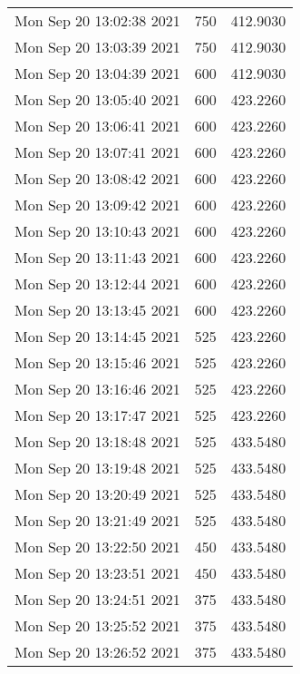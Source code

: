 \begin{longtable}{lrr}
Mon Sep 20 13:02:38 2021 &                750 &        412.9030 \\
Mon Sep 20 13:03:39 2021 &                750 &        412.9030 \\
Mon Sep 20 13:04:39 2021 &                600 &        412.9030 \\
Mon Sep 20 13:05:40 2021 &                600 &        423.2260 \\
Mon Sep 20 13:06:41 2021 &                600 &        423.2260 \\
Mon Sep 20 13:07:41 2021 &                600 &        423.2260 \\
Mon Sep 20 13:08:42 2021 &                600 &        423.2260 \\
Mon Sep 20 13:09:42 2021 &                600 &        423.2260 \\
Mon Sep 20 13:10:43 2021 &                600 &        423.2260 \\
Mon Sep 20 13:11:43 2021 &                600 &        423.2260 \\
Mon Sep 20 13:12:44 2021 &                600 &        423.2260 \\
Mon Sep 20 13:13:45 2021 &                600 &        423.2260 \\
Mon Sep 20 13:14:45 2021 &                525 &        423.2260 \\
Mon Sep 20 13:15:46 2021 &                525 &        423.2260 \\
Mon Sep 20 13:16:46 2021 &                525 &        423.2260 \\
Mon Sep 20 13:17:47 2021 &                525 &        423.2260 \\
Mon Sep 20 13:18:48 2021 &                525 &        433.5480 \\
Mon Sep 20 13:19:48 2021 &                525 &        433.5480 \\
Mon Sep 20 13:20:49 2021 &                525 &        433.5480 \\
Mon Sep 20 13:21:49 2021 &                525 &        433.5480 \\
Mon Sep 20 13:22:50 2021 &                450 &        433.5480 \\
Mon Sep 20 13:23:51 2021 &                450 &        433.5480 \\
Mon Sep 20 13:24:51 2021 &                375 &        433.5480 \\
Mon Sep 20 13:25:52 2021 &                375 &        433.5480 \\
Mon Sep 20 13:26:52 2021 &                375 &        433.5480 \\

\end{longtable}
